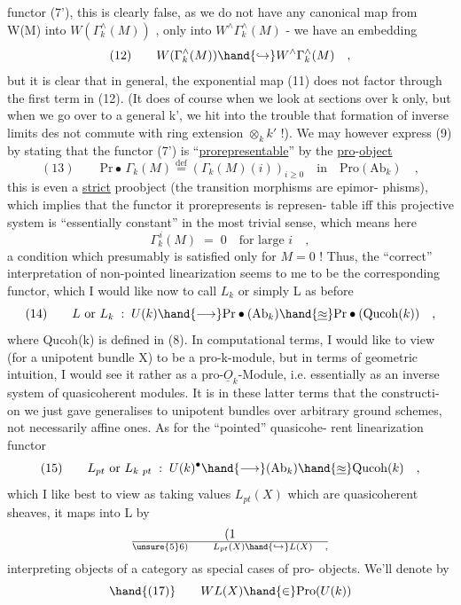 functor (7'), this is clearly false, as we do not have any canonical
map from W(M) into $W(\Gamma_k^{\wedge}(M))$ , only into $W^{\wedge}\Gamma_k^{\wedge}(M)$  - we have an
embedding
\[ (12) \qquad W(\Gamma_k^{\wedge}(M)) \hand{\hookrightarrow} W^{\wedge}\Gamma_k^{\wedge}(M) \quad , \]
but it is clear that in general, the exponential map (11) does not
factor through the first term in (12). (It does of course when we look
at sections over k only, but when we go over to a general k', we hit
into the trouble that formation of inverse limits des not commute with
ring extension $\otimes_k k'$ !). We may however express (9) by stating that the
functor (7') is ``\uline{prorepresentable}'' by the \uline{pro}-\uline{object}
\[ (13) \qquad \mathrm{Pr}\bullet\, \Gamma_k(M) \overset{\mathrm{def}}{=} (\Gamma_k(M)(i))_{i \geqslant 0} \quad \text{in} \quad \mathrm{Pro}(\mathrm{Ab}_k) \quad , \]
this is even a \uline{strict} proobject (the transition morphisms are epimor-%
phisms), which implies that the functor it prorepresents is represen-%
table iff this projective system is ``essentially constant'' in the most
trivial sense, which means here
\[ \Gamma_k^{\,i}(M) \;=\; 0 \quad \text{for large } i \quad , \]
a condition which presumably is satisfied only for $M=0$ ! Thus, the
``correct'' interpretation of non-pointed  linearization seems to me to
be the corresponding functor, which I would like now to call $L_k$ or
simply L as before 
\[ (14) \qquad L \text{ or } L_k \;:\; U(k) \hand{\longrightarrow} \mathrm{Pr}\bullet(\mathrm{Ab}_k) \hand{\underline{\approx}} \mathrm{Pr}\bullet(\mathrm{Qucoh}(k)) \quad , \]
where  Qucoh(k) is defined in (8). In computational terms, I
would like to view  (for a unipotent bundle X)  to be a
pro-k-module, but in terms of geometric intuition, I would see it
rather as a pro-$\underline{O}_k$-Module, i.e. essentially as an inverse system of
quasicoherent modules. It is in these latter terms that the constructi-%
on we just gave generalises to unipotent bundles over arbitrary ground
schemes, not necessarily affine ones. As for the ``pointed'' quasicohe-%
rent linearization functor
\[ (15) \qquad L_{pt} \text{ or } L_{k\ pt} \;:\; U(k)^{\bullet} \hand{\longrightarrow} (\mathrm{Ab}_k) \hand{\underline{\approx}} \mathrm{Qucoh}(k) \quad , \]
which I like best to view as taking values $L_{pt}(X)$ which are quasicoherent
sheaves, it maps into L by
\[ (1\over{\unsure{5}}{6}) \qquad L_{pt}(X) \hand{\hookrightarrow} L(X) \quad , \]
interpreting objects of  a category as special cases of pro-%
objects. We'll denote by
\[ \hand{(17)} \qquad WL(X) \hand{\in} \mathrm{Pro}(U(k)) \]
